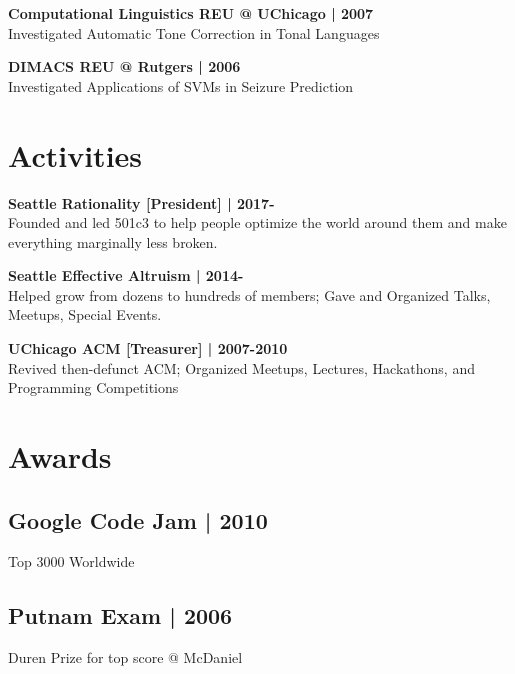 \documentclass[]{resume}
\begin{document}
\begin{minipage}[t]{0.33\textwidth}
\textbf{Computational Linguistics REU @ UChicago | 2007}\\
Investigated Automatic Tone Correction in Tonal Languages\\
\sectionsep

\textbf{DIMACS REU @ Rutgers | 2006}\\
Investigated Applications of SVMs in Seizure Prediction

\section{Activities}
\textbf{Seattle Rationality [President] | 2017-}\\
Founded and led 501c3 to help people optimize the world
around them and make everything marginally less broken.
\sectionsep

\textbf{Seattle Effective Altruism | 2014-}\\
Helped grow from dozens to hundreds of members;
Gave and Organized Talks, Meetups, Special Events.\\
\sectionsep

\textbf{UChicago ACM [Treasurer] | 2007-2010} \\
Revived then-defunct ACM; Organized Meetups, Lectures,
Hackathons, and Programming Competitions \\
\sectionsep

\section{Awards}
\subsection{Google Code Jam | 2010}
Top 3000 Worldwide \\
\sectionsep
\subsection{Putnam Exam | 2006}
Duren Prize for top score @ McDaniel

\sectionsep


%
%

\end{minipage}
\hfill
\end{document}
